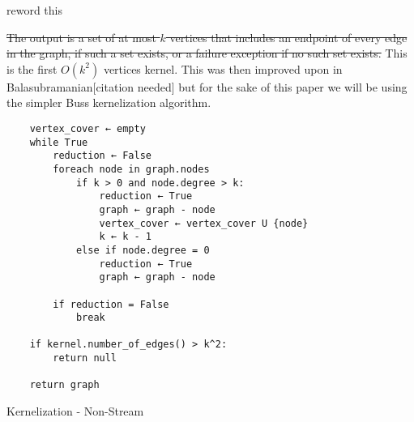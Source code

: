 reword this

\sout{The output is a set of at most \(k\) vertices that includes an
    endpoint of every edge in the graph, if such a set exists, or a failure
    exception if no such set exists.} This is the first \(O(k^2)\)
vertices kernel. This was then improved upon in
Balasubramanian{[}citation needed{]} but for the sake of this paper we
will be using the simpler Buss kernelization algorithm.

\begin{verbatim}
    vertex_cover ← empty
    while True
        reduction ← False
        foreach node in graph.nodes
            if k > 0 and node.degree > k:
                reduction ← True
                graph ← graph - node
                vertex_cover ← vertex_cover U {node}
                k ← k - 1
            else if node.degree = 0
                reduction ← True
                graph ← graph - node

        if reduction = False
            break

    if kernel.number_of_edges() > k^2:
        return null

    return graph
\end{verbatim}

\begin{algorithm}[H]
    \caption{Kernelization - Non-Stream}
    \DontPrintSemicolon

\end{algorithm}

